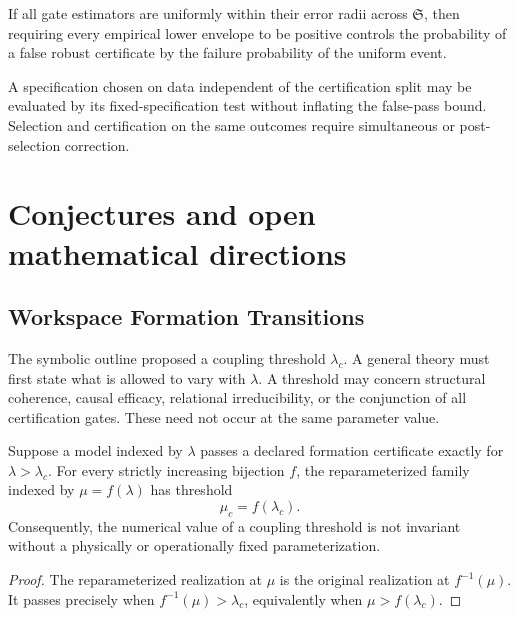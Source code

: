 If all gate estimators are uniformly within their error radii across
\(\mathfrak S\), then requiring every empirical lower envelope to be positive
controls the probability of a false robust certificate by the failure
probability of the uniform event.

A specification chosen on data independent of the certification split may be
evaluated by its fixed-specification test without inflating the false-pass
bound. Selection and certification on the same outcomes require simultaneous
or post-selection correction.


\chapter{Conjectures and open mathematical directions}\label{SRWT:book:chapter-86}


\section{Workspace Formation Transitions}

The symbolic outline proposed a coupling threshold \(\lambda_c\). A general
theory must first state what is allowed to vary with \(\lambda\). A threshold
may concern structural coherence, causal efficacy, relational irreducibility,
or the conjunction of all certification gates. These need not occur at the
same parameter value.


\begin{SRWTproposition}
\label{SRWT:prop:threshold-reparam}
Suppose a model indexed by \(\lambda\) passes a declared formation certificate
exactly for \(\lambda>\lambda_c\). For every strictly increasing bijection
\(f\), the reparameterized family indexed by \(\mu=f(\lambda)\) has threshold
\[
\mu_c=f(\lambda_c).
\]
Consequently, the numerical value of a coupling threshold is not invariant
without a physically or operationally fixed parameterization.
\end{SRWTproposition}

\begin{proof}
The reparameterized realization at \(\mu\) is the original realization at
\(f^{-1}(\mu)\). It passes precisely when
\(f^{-1}(\mu)>\lambda_c\), equivalently when
\(\mu>f(\lambda_c)\).
\end{proof}

